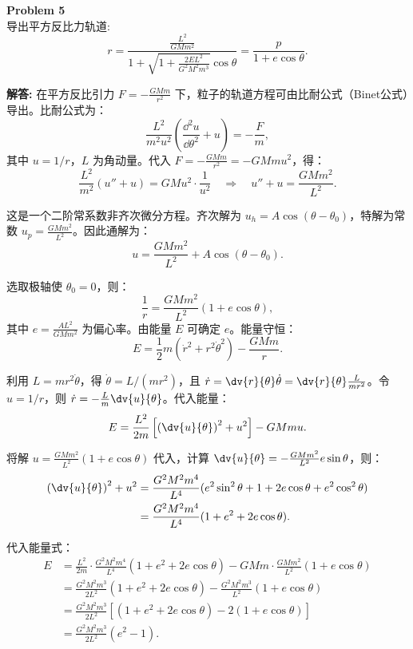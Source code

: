 \documentclass[12pt, a4paper, oneside]{ctexart}
\newenvironment{solution}{\par\noindent\textbf{解答:}\quad}{\par}
\begin{document}
\begin{mdframed}[backgroundcolor=gray!10, linewidth=0pt]
    \textbf{Problem 5} \\
    导出平方反比力轨道:
    \[
    r = \frac{\frac{L^2}{GMm^2}}{1 + \sqrt{1 + \frac{2EL^2}{G^2M^2m^3}} \cos\theta} = \frac{p}{1 + e \cos\theta}.
    \]
\end{mdframed}
\begin{solution}
    在平方反比引力 \(F = -\frac{GMm}{r^2}\) 下，粒子的轨道方程可由比耐公式（Binet公式）导出。比耐公式为：
    \[
    \frac{L^2}{m^2 u^2} \left( \frac{\dd^2 u}{\dd \theta^2} + u \right) = -\frac{F}{m},
    \]
    其中 \(u = 1/r\)，\(L\) 为角动量。代入 \(F = -\frac{GMm}{r^2} = -GMm u^2\)，得：
    \[
    \frac{L^2}{m^2} (u'' + u) = GM u^2 \cdot \frac{1}{u^2} \quad \Rightarrow \quad u'' + u = \frac{GM m^2}{L^2}.
    \]
    
    这是一个二阶常系数非齐次微分方程。齐次解为 \(u_h = A \cos(\theta - \theta_0)\)，特解为常数 \(u_p = \frac{GM m^2}{L^2}\)。因此通解为：
    \[
    u = \frac{GM m^2}{L^2} + A \cos(\theta - \theta_0).
    \]
    
    选取极轴使 \(\theta_0 = 0\)，则：
    \[
    \frac{1}{r} = \frac{GM m^2}{L^2} (1 + e \cos\theta),
    \]
    其中 \(e = \frac{A L^2}{GM m^2}\) 为偏心率。由能量 \(E\) 可确定 \(e\)。能量守恒：
    \[
    E = \frac{1}{2} m (\dot{r}^2 + r^2 \dot{\theta}^2) - \frac{GMm}{r}.
    \]
    
    利用 \(L = m r^2 \dot{\theta}\)，得 \(\dot{\theta} = L/(m r^2)\)，且 \(\dot{r} = \dv{r}{\theta} \dot{\theta} = \dv{r}{\theta} \frac{L}{m r^2}\)。令 \(u = 1/r\)，则 \(\dot{r} = -\frac{L}{m} \dv{u}{\theta}\)。代入能量：
    \[
    E = \frac{L^2}{2m} \left[ \left(\dv{u}{\theta}\right)^2 + u^2 \right] - GMm u.
    \]
    
    将解 \(u = \frac{GM m^2}{L^2} (1 + e \cos\theta)\) 代入，计算 \(\dv{u}{\theta} = -\frac{GM m^2}{L^2} e \sin\theta\)，则：
    \begin{align*}
        \left(\dv{u}{\theta}\right)^2 + u^2 &= \frac{G^2 M^2 m^4}{L^4} (e^2 \sin^2\theta + 1 + 2e \cos\theta + e^2 \cos^2\theta) \\
        &= \frac{G^2 M^2 m^4}{L^4} (1 + e^2 + 2e \cos\theta).
    \end{align*}
    
    代入能量式：
    \begin{align*}
        E &= \frac{L^2}{2m} \cdot \frac{G^2 M^2 m^4}{L^4} (1 + e^2 + 2e \cos\theta) - GMm \cdot \frac{GM m^2}{L^2} (1 + e \cos\theta) \\
        &= \frac{G^2 M^2 m^3}{2 L^2} (1 + e^2 + 2e \cos\theta) - \frac{G^2 M^2 m^3}{L^2} (1 + e \cos\theta) \\
        &= \frac{G^2 M^2 m^3}{2 L^2} \left[ (1 + e^2 + 2e \cos\theta) - 2(1 + e \cos\theta) \right] \\
        &= \frac{G^2 M^2 m^3}{2 L^2} (e^2 - 1).
    \end{align*}
    

\end{solution}
\end{document}
